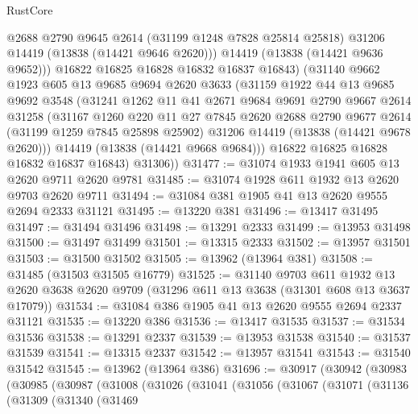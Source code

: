 \begin{lexlean}{RustCore}
\begin{coremodule}
            @2688
            @2790
            @9645
            @2614
            (@31199 @1248 @7828 @25814 @25818)
            @31206
            @14419
            (@13838 (@14421 @9646 @2620)))
          @14419
          (@13838 (@14421 @9636 @9652)))
        @16822
        @16825
        @16828
        @16832
        @16837
        @16843)
      (@31140
        @9662
        @1923
        @605
        @13
        @9685
        @9694
        @2620
        @3633
        (@31159
          @1922
          @44
          @13
          @9685
          @9692
          @3548
          (@31241
            @1262
            @11
            @41
            @2671
            @9684
            @9691
            @2790
            @9667
            @2614
            @31258
            (@31167
              @1260
              @220
              @11
              @27
              @7845
              @2620
              @2688
              @2790
              @9677
              @2614
              (@31199 @1259 @7845 @25898 @25902)
              @31206
              @14419
              (@13838 (@14421 @9678 @2620)))
            @14419
            (@13838 (@14421 @9668 @9684)))
          @16822
          @16825
          @16828
          @16832
          @16837
          @16843)
        @31306))
@31477 := @31074 @1933 @1941 @605 @13 @2620 @9711 @2620 @9781
@31485 := @31074 @1928 @611 @1932 @13 @2620 @9703 @2620 @9711
@31494 := @31084 @381 @1905 @41 @13 @2620 @9555 @2694 @2333 @31121
@31495 := @13220 @381
@31496 := @13417 @31495
@31497 := @31494 @31496
@31498 := @13291 @2333
@31499 := @13953 @31498
@31500 := @31497 @31499
@31501 := @13315 @2333
@31502 := @13957 @31501
@31503 := @31500 @31502
@31505 := @13962 (@13964 @381)
@31508 := @31485 (@31503 @31505 @16779)
@31525 := @31140
    @9703
    @611
    @1932
    @13
    @2620
    @3638
    @2620
    @9709
    (@31296 @611 @13 @3638 (@31301 @608 @13 @3637 @17079))
@31534 := @31084 @386 @1905 @41 @13 @2620 @9555 @2694 @2337 @31121
@31535 := @13220 @386
@31536 := @13417 @31535
@31537 := @31534 @31536
@31538 := @13291 @2337
@31539 := @13953 @31538
@31540 := @31537 @31539
@31541 := @13315 @2337
@31542 := @13957 @31541
@31543 := @31540 @31542
@31545 := @13962 (@13964 @386)
@31696 := @30917
    (@30942
      (@30983
        (@30985
          (@30987
            (@31008
              (@31026
                (@31041
                  (@31056
                    (@31067
                      (@31071
                        (@31136
                          (@31309
                            (@31340
                              (@31469

\end{coremodule}
\end{lexlean}
